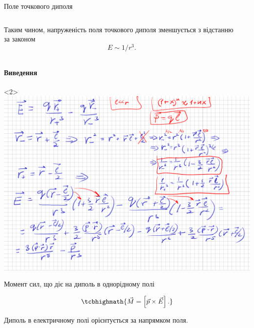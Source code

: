 \documentclass{beamer}
\begin{document}
\begin{frame}{Поле точкового диполя}
\begin{onlyenv}
\begin{columns}
\begin{column}{0.75\linewidth}
\begin{block}{}
					Таким чином, напруженість поля точкового диполя зменшується з
					відстанню за законом
					\begin{equation*}
						E \sim 1/{r^3}.
					\end{equation*}
				\end{block}
			\end{column}
			\begin{column}{0.25\linewidth}\centering
				
			\end{column}
		\end{columns}
	\end{onlyenv}
	\framesubtitle<2>{Виведення}
	\begin{onlyenv}
		\includegraphics[width=\linewidth]{dipolefield.pdf}
	\end{onlyenv}
\end{frame}



\begin{frame}{Момент сил, що діє на диполь в однорідному полі}{}
	\begin{center}
		
	\end{center}

	\begin{equation*}
		\tcbhighmath{
			\vec{M} = \left[\vec{p}\times\vec{E}\right].
		}
	\end{equation*}

	\begin{alertblock}{}
		Диполь в електричному полі орієнтується за напрямком поля.
	\end{alertblock}
\end{frame}
\end{document}
